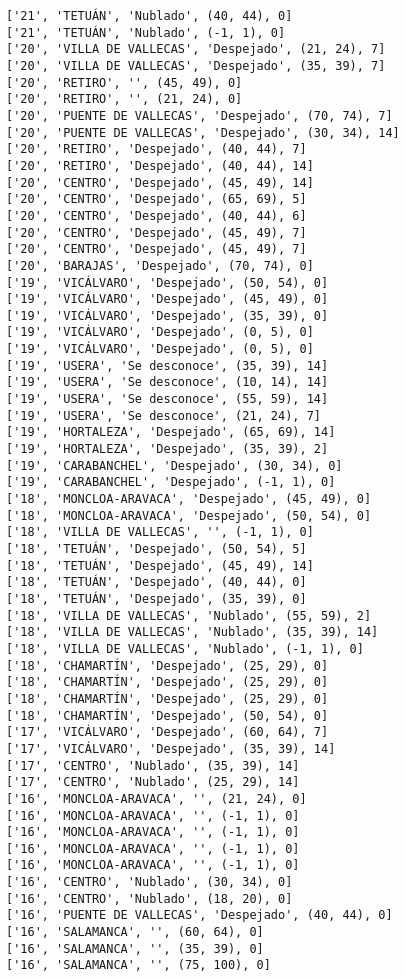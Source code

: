 \documentclass[11pt]{article}
\begin{document}
\begin{Verbatim}[commandchars=\\\{\}]
['21', 'TETUÁN', 'Nublado', (40, 44), 0]
['21', 'TETUÁN', 'Nublado', (-1, 1), 0]
['20', 'VILLA DE VALLECAS', 'Despejado', (21, 24), 7]
['20', 'VILLA DE VALLECAS', 'Despejado', (35, 39), 7]
['20', 'RETIRO', '', (45, 49), 0]
['20', 'RETIRO', '', (21, 24), 0]
['20', 'PUENTE DE VALLECAS', 'Despejado', (70, 74), 7]
['20', 'PUENTE DE VALLECAS', 'Despejado', (30, 34), 14]
['20', 'RETIRO', 'Despejado', (40, 44), 7]
['20', 'RETIRO', 'Despejado', (40, 44), 14]
['20', 'CENTRO', 'Despejado', (45, 49), 14]
['20', 'CENTRO', 'Despejado', (65, 69), 5]
['20', 'CENTRO', 'Despejado', (40, 44), 6]
['20', 'CENTRO', 'Despejado', (45, 49), 7]
['20', 'CENTRO', 'Despejado', (45, 49), 7]
['20', 'BARAJAS', 'Despejado', (70, 74), 0]
['19', 'VICÁLVARO', 'Despejado', (50, 54), 0]
['19', 'VICÁLVARO', 'Despejado', (45, 49), 0]
['19', 'VICÁLVARO', 'Despejado', (35, 39), 0]
['19', 'VICÁLVARO', 'Despejado', (0, 5), 0]
['19', 'VICÁLVARO', 'Despejado', (0, 5), 0]
['19', 'USERA', 'Se desconoce', (35, 39), 14]
['19', 'USERA', 'Se desconoce', (10, 14), 14]
['19', 'USERA', 'Se desconoce', (55, 59), 14]
['19', 'USERA', 'Se desconoce', (21, 24), 7]
['19', 'HORTALEZA', 'Despejado', (65, 69), 14]
['19', 'HORTALEZA', 'Despejado', (35, 39), 2]
['19', 'CARABANCHEL', 'Despejado', (30, 34), 0]
['19', 'CARABANCHEL', 'Despejado', (-1, 1), 0]
['18', 'MONCLOA-ARAVACA', 'Despejado', (45, 49), 0]
['18', 'MONCLOA-ARAVACA', 'Despejado', (50, 54), 0]
['18', 'VILLA DE VALLECAS', '', (-1, 1), 0]
['18', 'TETUÁN', 'Despejado', (50, 54), 5]
['18', 'TETUÁN', 'Despejado', (45, 49), 14]
['18', 'TETUÁN', 'Despejado', (40, 44), 0]
['18', 'TETUÁN', 'Despejado', (35, 39), 0]
['18', 'VILLA DE VALLECAS', 'Nublado', (55, 59), 2]
['18', 'VILLA DE VALLECAS', 'Nublado', (35, 39), 14]
['18', 'VILLA DE VALLECAS', 'Nublado', (-1, 1), 0]
['18', 'CHAMARTÍN', 'Despejado', (25, 29), 0]
['18', 'CHAMARTÍN', 'Despejado', (25, 29), 0]
['18', 'CHAMARTÍN', 'Despejado', (25, 29), 0]
['18', 'CHAMARTÍN', 'Despejado', (50, 54), 0]
['17', 'VICÁLVARO', 'Despejado', (60, 64), 7]
['17', 'VICÁLVARO', 'Despejado', (35, 39), 14]
['17', 'CENTRO', 'Nublado', (35, 39), 14]
['17', 'CENTRO', 'Nublado', (25, 29), 14]
['16', 'MONCLOA-ARAVACA', '', (21, 24), 0]
['16', 'MONCLOA-ARAVACA', '', (-1, 1), 0]
['16', 'MONCLOA-ARAVACA', '', (-1, 1), 0]
['16', 'MONCLOA-ARAVACA', '', (-1, 1), 0]
['16', 'MONCLOA-ARAVACA', '', (-1, 1), 0]
['16', 'CENTRO', 'Nublado', (30, 34), 0]
['16', 'CENTRO', 'Nublado', (18, 20), 0]
['16', 'PUENTE DE VALLECAS', 'Despejado', (40, 44), 0]
['16', 'SALAMANCA', '', (60, 64), 0]
['16', 'SALAMANCA', '', (35, 39), 0]
['16', 'SALAMANCA', '', (75, 100), 0]

\end{Verbatim}
\end{document}
